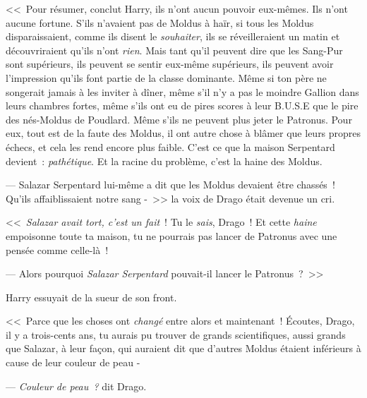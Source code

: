 <<~Pour résumer, conclut Harry, ils n'ont aucun pouvoir eux-mêmes. Ils n'ont aucune fortune. S'ils n'avaient pas de Moldus à haïr, si tous les Moldus disparaissaient, comme ils disent le \emph{souhaiter}, ils se réveilleraient un matin et découvriraient qu'ils n'ont \emph{rien}. Mais tant qu'il peuvent dire que les Sang-Pur sont supérieurs, ils peuvent se sentir eux-même supérieurs, ils peuvent avoir l'impression qu'ils font partie de la classe dominante. Même si ton père ne songerait jamais à les inviter à dîner, même s'il n'y a pas le moindre Gallion dans leurs chambres fortes, même s'ils ont eu de pires scores à leur B.U.S.E que le pire des nés-Moldus de Poudlard. Même s'ils ne peuvent plus jeter le Patronus. Pour eux, tout est de la faute des Moldus, il ont autre chose à blâmer que leurs propres échecs, et cela les rend encore plus faible. C'est ce que la maison Serpentard devient~: \emph{pathétique}. Et la racine du problème, c'est la haine des Moldus.

--- Salazar Serpentard lui-même a dit que les Moldus devaient être chassés~! Qu'ils affaiblissaient notre sang -~>> la voix de Drago était devenue un cri.

<<~\emph{Salazar avait tort, c'est un fait}~! Tu le \emph{sais}, Drago~! Et cette \emph{haine} empoisonne toute ta maison, tu ne pourrais pas lancer de Patronus avec une pensée comme celle-là~!

--- Alors pourquoi \emph{Salazar Serpentard} pouvait-il lancer le Patronus~?~>>

Harry essuyait de la sueur de son front. 

<<~Parce que les choses ont \emph{changé} entre alors et maintenant~! Écoutes, Drago, il y a trois-cents ans, tu aurais pu trouver de grands scientifiques, aussi grands que Salazar, à leur façon, qui auraient dit que d'autres Moldus étaient inférieurs à cause de leur couleur de peau -

--- \emph{Couleur de peau~?} dit Drago.

